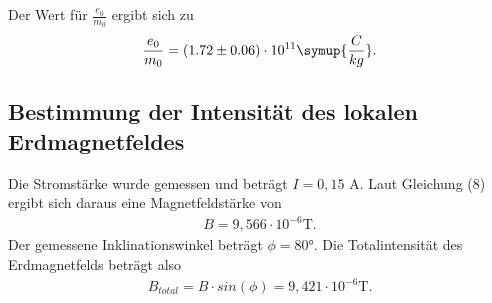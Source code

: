 Der Wert für $\frac{e_0}{m_0}$ ergibt sich zu
\begin{align*}
\frac{e_0}{m_0} = (1.72 \pm 0.06) \cdot 10^{11} \symup{\frac{C}{kg}}.
\end{align*}


\subsection{Bestimmung der Intensität des lokalen Erdmagnetfeldes}
Die Stromstärke wurde gemessen und beträgt $I = 0,15$ \si{\ampere}.
Laut Gleichung (8) ergibt sich daraus eine Magnetfeldstärke von
\begin{align*}
    B = 9,566 \cdot 10^{-6} \si{\tesla}.
\end{align*}
Der gemessene Inklinationswinkel beträgt $\phi = 80°$.
Die Totalintensität des Erdmagnetfelds beträgt also
\begin{align*}
    B_{total} = B \cdot sin(\phi) = 9,421 \cdot 10^{-6} \si{\tesla}.
\end{align*}
